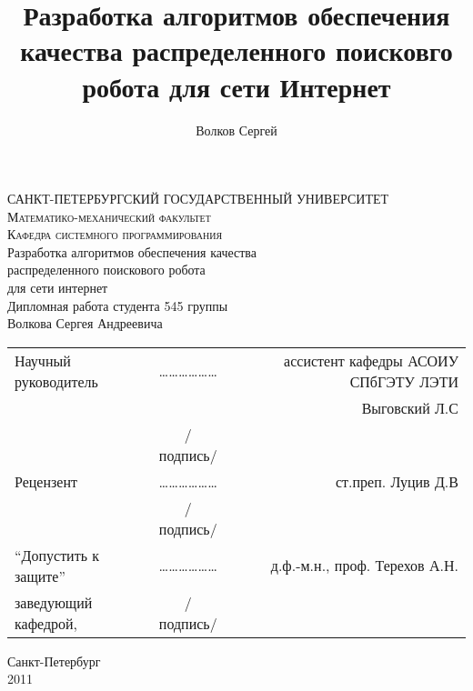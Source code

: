 \documentclass[a4paper,10pt]{report}
\title{Разработка алгоритмов обеспечения качества распределенного поисковго робота для сети Интернет}
\author{Волков Сергей}
\begin{document}
\begin{titlepage}
\begin{center}

\textsc{САНКТ-ПЕТЕРБУРГСКИЙ ГОСУДАРСТВЕННЫЙ УНИВЕРСИТЕТ}\\
\textsc{Математико-механический факультет}\\[1.0cm]

\textsc{Кафедра системного программирования}\\[3.0cm]

{ \LARGE Разработка алгоритмов обеспечения качества}\\[1.0cm]
{ \LARGE распределенного поискового робота}\\[1.0cm]
{ \LARGE для сети интернет}\\[1.0cm]
{Дипломная работа студента 545 группы \\ Волкова Сергея Андреевича}\\[3.0cm]

\begin{tabular}{lcr}
Научный руководитель & ……………… & ассистент кафедры АСОИУ СПбГЭТУ ЛЭТИ\\ & & Выговский Л.С \\
& /подпись/ & \\[1.0cm]
Рецензент            & ……………… & ст.преп. Луцив Д.В \\
& /подпись/ & \\[1.0cm]
``Допустить к защите'' & ……………… & д.ф.-м.н., проф. Терехов А.Н. \\
заведующий кафедрой, & /подпись/ & \\
\end{tabular}

\vfill

{\large Санкт-Петербург \\ 2011}

\end{center}
\end{titlepage}
\end{document}
